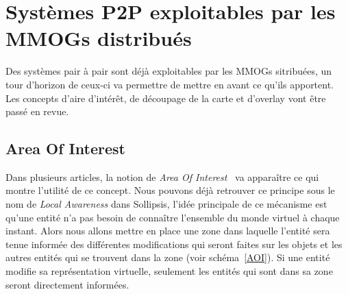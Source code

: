 \section{Systèmes P2P exploitables par les MMOGs distribués}
	Des systèmes pair à pair sont déjà exploitables par les MMOGs sitribuées, un tour d'horizon de ceux-ci va permettre de mettre en avant ce qu'ils apportent. Les concepts d'aire d'intérêt, de découpage de la carte et d'overlay vont être passé en revue.
	\subsection{Area Of Interest}
	Dans plusieurs articles, la notion de \textit{Area Of Interest}~\cite{1403002,1267692,1015507} va apparaître ce qui montre l'utilité de ce concept. Nous pouvons déjà retrouver ce principe sous le nom de \textit{Local Awareness} dans Sollipsis, l'idée principale de ce mécanisme est qu'une entité n'a pas besoin de connaître l'ensemble du monde virtuel à chaque instant. Alors nous allons mettre en place une zone dans laquelle l'entité sera tenue informée des différentes modifications qui seront faites sur les objets et les autres entités qui se trouvent dans la zone (voir schéma~\ref{AOI}). Si une entité modifie sa représentation virtuelle, seulement les entités qui sont dans sa zone seront directement informées.\\

